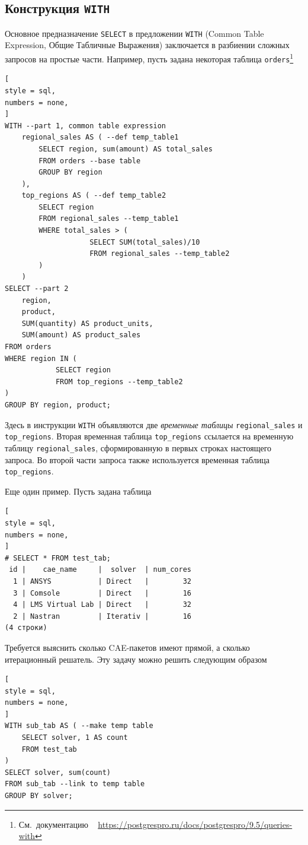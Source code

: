 \documentclass[%
	11pt,
	a4paper,
	utf8,
		]{article}
\begin{document}
\subsection{Конструкция \texttt{WITH}}

Основное предназначение \texttt{SELECT} в предложении \texttt{WITH} (Common Table Expression, Общие Табличные Выражения) заключается в разбиении сложных запросов на простые части. Например, пусть задана некоторая таблица \texttt{orders}\footnote{См.~документацию \psql~ \url{https://postgrespro.ru/docs/postgrespro/9.5/queries-with}}

\begin{lstlisting}[
style = sql,
numbers = none,
]
WITH --part 1, common table expression
    regional_sales AS ( --def temp_table1
        SELECT region, sum(amount) AS total_sales
        FROM orders --base table
        GROUP BY region
    ),
    top_regions AS ( --def temp_table2
        SELECT region
        FROM regional_sales --temp_table1
        WHERE total_sales > (
                    SELECT SUM(total_sales)/10
                    FROM regional_sales --temp_table2
        )
    )
SELECT --part 2
    region,
    product,
    SUM(quantity) AS product_units,
    SUM(amount) AS product_sales
FROM orders
WHERE region IN (
            SELECT region
            FROM top_regions --temp_table2
)
GROUP BY region, product;
\end{lstlisting}

Здесь в инструкции \texttt{WITH} объявляются две \emph{временные таблицы} \texttt{regional\_sales} и \texttt{top\_regions}. Вторая временная таблица \texttt{top\_regions} ссылается на временную таблицу \texttt{regional\_sales}, сформированную в первых строках настоящего запроса. Во второй части запроса также используется временная таблица \texttt{top\_regions}.

Еще один пример. Пусть задана таблица
\begin{lstlisting}[
style = sql,
numbers = none,
]
# SELECT * FROM test_tab;
 id |    cae_name     |  solver  | num_cores
  1 | ANSYS           | Direct   |        32
  3 | Comsole         | Direct   |        16
  4 | LMS Virtual Lab | Direct   |        32
  2 | Nastran         | Iterativ |        16
(4 строки)
\end{lstlisting}

Требуется выяснить сколько CAE-пакетов имеют прямой, а сколько итерационный решатель. Эту задачу можно решить следующим образом

\begin{lstlisting}[
style = sql,
numbers = none,
]
WITH sub_tab AS ( --make temp table
    SELECT solver, 1 AS count
    FROM test_tab
)
SELECT solver, sum(count)
FROM sub_tab --link to temp table
GROUP BY solver;
\end{lstlisting}
\end{document}
